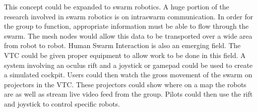 \documentclass{IEEEtran}
\begin{document}
This concept could be expanded to swarm robotics. A huge portion of the research involved in swarm robotics is on intraswarm communication. In order for the group to function, appropriate information must be able to flow through the swarm. The mesh nodes would allow this data to be transported over a wide area from robot to robot. Human Swarm Interaction is also an emerging field. The VTC could be given proper equipment to allow work to be done in this field. A system involving an oculus rift and a joystick or gamepad could be used to create a simulated cockpit. Users could then watch the gross movement of the swarm on projectors in the VTC. These projectors could show where on a map the robots are as well as stream live video feed from the group. Pilots could then use the rift and joystick to control specific robots.
\end{document}
